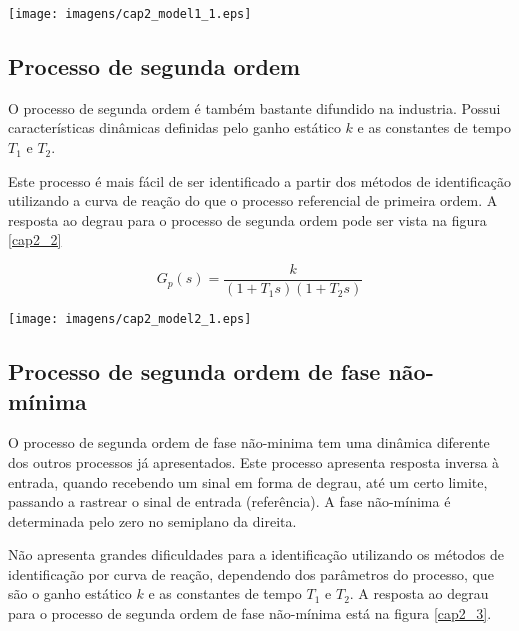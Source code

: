     \begin{center}
        \texttt{[image: imagens/cap2\_model1\_1.eps]}
    \label{cap2_1}
    \end{center}

\subsection{Processo de segunda ordem}
    
    O processo de segunda ordem é também bastante difundido na industria. Possui
    características dinâmicas definidas pelo ganho estático $k$ e as constantes de
    tempo $T_1$ e $T_2$.
    
    Este processo é mais fácil de ser identificado a partir dos métodos de
    identificação utilizando a curva de reação do que o processo referencial de
    primeira ordem. A resposta ao degrau para o processo de segunda ordem pode
    ser vista na figura \ref{cap2_2}
    
    \begin{equation}
        G_p(s) = \frac{k}{(1+T_1 s)(1+T_2 s)}
    \end{equation}
    
    \begin{center}
        \texttt{[image: imagens/cap2\_model2\_1.eps]}
    \label{cap2_2}
    \end{center}

\subsection{Processo de segunda ordem de fase não-mínima}

    O processo de segunda ordem de fase não-minima tem uma dinâmica diferente dos
    outros processos já apresentados. Este processo apresenta resposta inversa à
    entrada, quando recebendo um sinal em forma de degrau, até um certo limite,
    passando a rastrear o sinal de entrada (referência). A fase não-mínima é
    determinada pelo zero no semiplano da direita.
    
    Não apresenta grandes dificuldades para a identificação utilizando os métodos
    de identificação por curva de reação, dependendo dos parâmetros do processo,
    que são o ganho estático $k$ e as constantes de tempo $T_1$ e $T_2$. A resposta
    ao degrau para o processo de segunda ordem de fase não-mínima está na figura
    \ref{cap2_3}.

